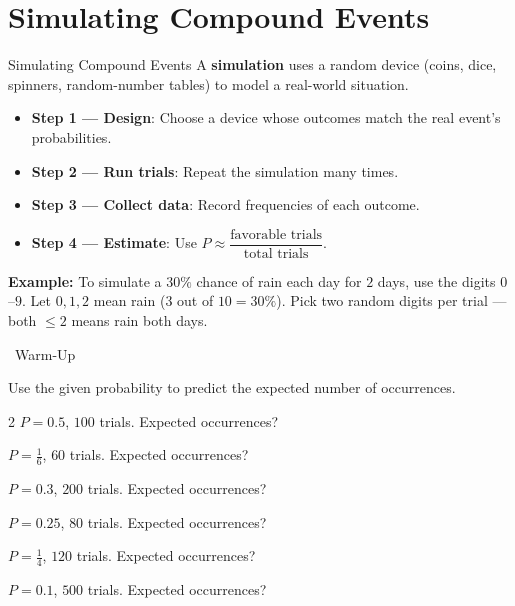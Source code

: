 \section{Simulating Compound Events}

\begin{quickReview}{Simulating Compound Events}
A \textbf{simulation} uses a random device (coins, dice, spinners, random-number tables) to model a real-world situation.

\begin{itemize}[leftmargin=*]
    \item \textbf{Step 1 — Design}: Choose a device whose outcomes match the real event's probabilities.
    \item \textbf{Step 2 — Run trials}: Repeat the simulation many times.
    \item \textbf{Step 3 — Collect data}: Record frequencies of each outcome.
    \item \textbf{Step 4 — Estimate}: Use $P \approx \dfrac{\text{favorable trials}}{\text{total trials}}$.
\end{itemize}

\medskip
\textbf{Example:} To simulate a $30\%$ chance of rain each day for $2$ days, use the digits $0$--$9$. Let $0, 1, 2$ mean rain ($3$ out of $10 = 30\%$). Pick two random digits per trial — both $\leq 2$ means rain both days.
\end{quickReview}

\begin{practiceBox}[funGreen]{\faSun~Warm-Up}

Use the given probability to predict the expected number of occurrences.

\begin{multicols}{2}
\prob $P = 0.5$, $100$ trials. Expected occurrences? \answerBlank[2cm]

\prob $P = \frac{1}{6}$, $60$ trials. Expected occurrences? \answerBlank[2cm]

\prob $P = 0.3$, $200$ trials. Expected occurrences? \answerBlank[2cm]

\prob $P = 0.25$, $80$ trials. Expected occurrences? \answerBlank[2cm]

\prob $P = \frac{1}{4}$, $120$ trials. Expected occurrences? \answerBlank[2cm]

\prob $P = 0.1$, $500$ trials. Expected occurrences? \answerBlank[2cm]
\end{multicols}
\end{practiceBox}

